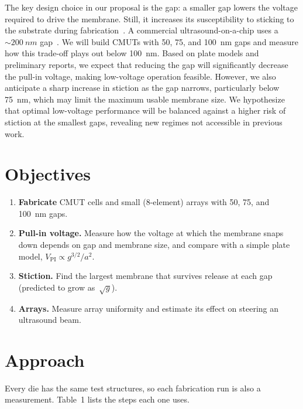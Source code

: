 \documentclass[11pt]{article}
\newcommand{\VPI}{V_{\mathrm{PI}}}
\begin{document}
The key design choice in our proposal is the gap: a smaller gap lowers the voltage required to drive the membrane. Still, it increases its susceptibility to sticking to the substrate during fabrication~\cite{brenner2019,gerardo2018}. A commercial ultrasound-on-a-chip uses a ${\sim}\SI{200}{nm}$ gap~\cite{rothberg2021}. We will build CMUTs with 50, 75, and \SI{100}{nm} gaps and measure how this trade-off plays out below \SI{100}{nm}. Based on plate models and preliminary reports, we expect that reducing the gap will significantly decrease the pull-in voltage, making low-voltage operation feasible. However, we also anticipate a sharp increase in stiction as the gap narrows, particularly below \SI{75}{nm}, which may limit the maximum usable membrane size. We hypothesize that optimal low-voltage performance will be balanced against a higher risk of stiction at the smallest gaps, revealing new regimes not accessible in previous work.

\section{Objectives}

\begin{enumerate}[label=\textbf{O\arabic*}, leftmargin=2.6em]
  \item \textbf{Fabricate} CMUT cells and small (8-element) arrays with 50, 75, and \SI{100}{nm} gaps.
  \item \textbf{Pull-in voltage.} Measure how the voltage at which the membrane snaps down depends on gap and membrane size, and compare with a simple plate model, $\VPI \propto g^{3/2}/a^{2}$.
  \item \textbf{Stiction.} Find the largest membrane that survives release at each gap (predicted to grow as~$\sqrt{g}$).
  \item \textbf{Arrays.} Measure array uniformity and estimate its effect on steering an ultrasound beam.
\end{enumerate}

\section{Approach}

Every die has the same test structures, so each fabrication run is also a measurement. Table~1 lists the steps each one uses.
\end{document}

